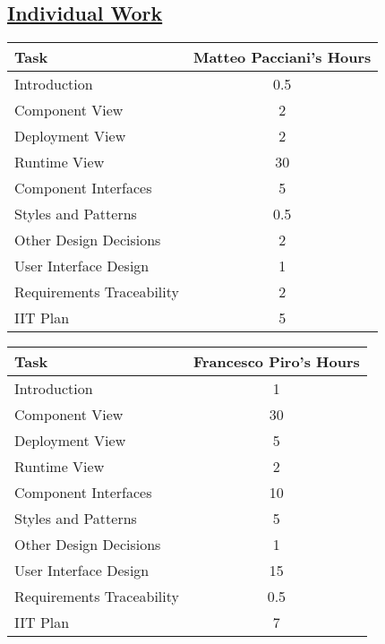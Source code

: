 \subsection[Individual Work]{\hyperlink{toc}{Individual Work}}
\vspace{2mm}
\begin{center}
	\begin{tabular}{| l | c |}
	\hline
	\textbf{Task} & \textbf{Matteo Pacciani's Hours} \\ \hline
	Introduction & 0.5 \\ \hline
	Component View & 2 \\ \hline
	Deployment View & 2 \\ \hline
	Runtime View & 30 \\ \hline
	Component Interfaces & 5 \\ \hline
	Styles and Patterns & 0.5 \\ \hline
	Other Design Decisions & 2 \\ \hline
	User Interface Design & 1 \\ \hline
	Requirements Traceability & 2 \\ \hline
	IIT Plan & 5 \\
	\hline	
	\end{tabular}
	
	\vspace{2mm}
	
	\begin{tabular}{| l | c |}
	\hline
	\textbf{Task} & \textbf{Francesco Piro's Hours} \\ \hline
	Introduction & 1 \\ \hline
	Component View & 30 \\ \hline
	Deployment View & 5 \\ \hline
	Runtime View & 2 \\ \hline
	Component Interfaces & 10 \\ \hline
	Styles and Patterns & 5 \\ \hline
	Other Design Decisions & 1 \\ \hline
	User Interface Design & 15 \\ \hline
	Requirements Traceability & 0.5 \\ \hline
	IIT Plan & 7 \\
	\hline
	\end{tabular}
\end{center}